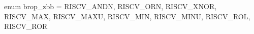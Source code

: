 enum brop_zbb = {RISCV_ANDN, RISCV_ORN, RISCV_XNOR, RISCV_MAX,
                 RISCV_MAXU, RISCV_MIN, RISCV_MINU, RISCV_ROL,
                 RISCV_ROR}
